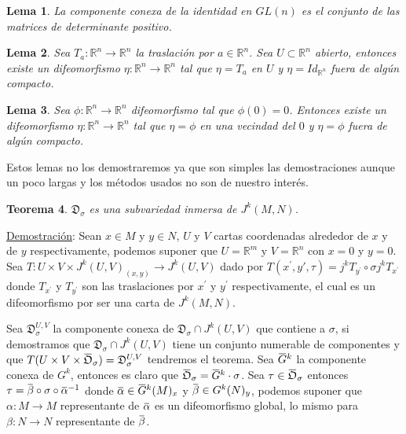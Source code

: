 \documentclass{report}
\newtheorem{theorem}{Teorema}[section]
\newtheorem{lem}[theorem]{Lema}
\theoremstyle{definition}
\newcommand{\overbar}[1]{\mkern 1.5mu\overline{\mkern-1.5mu#1\mkern-1.5mu}\mkern 1.5mu}
\begin{document}
\begin{lem}
La componente conexa de la identidad en $GL(n)$ es el conjunto de las matrices de determinante positivo.
\end{lem}

\begin{lem}
Sea $T_a: \mathbb{R}^n \to \mathbb{R}^n$ la traslaci\'on por $a \in \mathbb{R}^n$. Sea $U \subset \mathbb{R}^n$ abierto, entonces existe un difeomorfismo $\eta: \mathbb{R}^n \to \mathbb{R}^n$ tal que $\eta = T_a$ en $U$ y $\eta=Id_{\mathbb{R}^n}$ fuera de alg\'un compacto.
\end{lem}

\begin{lem}
Sea $\phi: \mathbb{R}^n \to \mathbb{R}^n$ difeomorfismo tal que $\phi(0) = 0$. Entonces existe un difeomorfismo $\eta: \mathbb{R}^n \to \mathbb{R}^n$ tal que $\eta= \phi$ en una vecindad del $0$ y $\eta=\phi$ fuera de alg\'un compacto.
\end{lem}

Estos lemas no los demostraremos ya que son simples las demostraciones aunque un poco largas y los m\'etodos usados no son de nuestro inter\'es.

\begin{theorem}
$\mathfrak{D}_\sigma$ es una subvariedad inmersa de $J^k (M,N)$.
\end{theorem}

\underline{Demostraci\'on}: Sean $x \in M $ y $y \in N$, $U$ y $V$ cartas coordenadas alrededor de $x$ y de $y$ respectivamente, podemos suponer que $U= \mathbb{R}^m$ y $V = \mathbb{R}^n$ con $x= 0$ y $y=0$. Sea $T: U \times V \times J^k (U,V)_{(x,y)} \to J^k(U,V)$ dado por $T(x^\prime, y\prime , \tau ) = j^k T_{y^\prime} \circ \sigma j^k T_{x^\prime}$ donde $T_{x^\prime}$ y $T_{y^\prime}$ son las traslaciones por $x^\prime$ y $y^\prime$ respectivamente, el cual es un difeomorfismo por ser una carta de $J^k (M,N)$.

Sea $\mathfrak{D}_\sigma^{U,V}$ la componente conexa de $\mathfrak{D}_\sigma \cap J^k (U,V)$ que contiene a $\sigma$, si demostramos que $\mathfrak{D}_\sigma \cap J^k (U,V)$ tiene un conjunto numerable de componentes y que $T(U \times V \times \overbar{\mathfrak{O}}_\sigma ) = \mathfrak{D}_\sigma^{U,V}$ tendremos el teorema. Sea $\overbar{G}^k$ la componente conexa de $G^k$, entonces es claro que $\overbar{\mathfrak{O}}_\sigma = \overbar{G}^k \cdot \sigma$. Sea $\tau \in \overbar{\mathfrak{O}}_\sigma$ entonces $\tau = \overbar{\beta} \circ \sigma  \circ \overbar{\alpha}^{-1}$ donde $\overbar{\alpha} \in \overbar{G}^k(M)_x $ y $\overbar{\beta} \in G^k(N)_y$, podemos suponer que $\alpha: M \to M$ representante de $\overbar{\alpha}$ es un difeomorfismo global, lo mismo para $\beta:N \to N$ representante de $\overbar{\beta}$.
\end{document}
